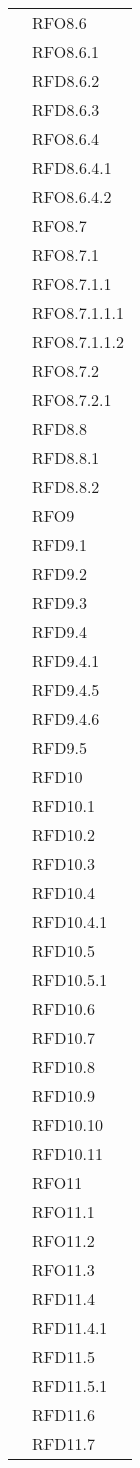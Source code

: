\begin{longtable}{|>{\centering}m{10cm}|m{3cm}<{\centering}|}
& RFO8.6\\
& RFO8.6.1\\
& RFD8.6.2\\
& RFD8.6.3\\
& RFO8.6.4\\
& RFD8.6.4.1\\
& RFO8.6.4.2\\
& RFO8.7\\
& RFO8.7.1\\
& RFO8.7.1.1\\
& RFO8.7.1.1.1\\
& RFO8.7.1.1.2\\
& RFO8.7.2\\
& RFO8.7.2.1\\
& RFD8.8\\
& RFD8.8.1\\
& RFD8.8.2\\
& RFO9\\
& RFD9.1\\
& RFD9.2\\
& RFD9.3\\
& RFD9.4\\
& RFD9.4.1\\
& RFD9.4.5\\
& RFD9.4.6\\
& RFD9.5\\
& RFD10\\
& RFD10.1\\
& RFD10.2\\
& RFD10.3\\
& RFD10.4\\
& RFD10.4.1\\
& RFD10.5\\
& RFD10.5.1\\
& RFD10.6\\
& RFD10.7\\
& RFD10.8\\
& RFD10.9\\
& RFD10.10\\
& RFD10.11\\
& RFO11\\
& RFO11.1\\
& RFO11.2\\
& RFO11.3\\
& RFD11.4\\
& RFD11.4.1\\
& RFD11.5\\
& RFD11.5.1\\
& RFD11.6\\
& RFD11.7\\

\end{longtable}
